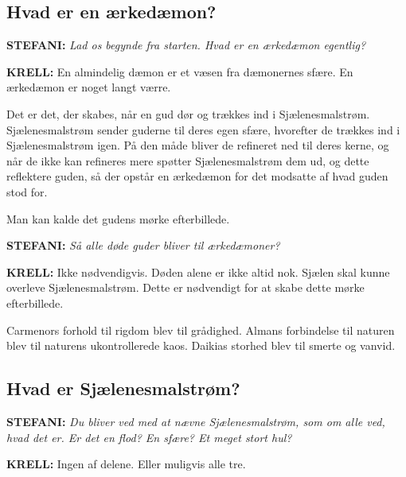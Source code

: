 \documentclass[a4paper,12pt]{memoir}
\begin{document}
\subsection*{Hvad er en ærkedæmon?}

\noindent
{\sffamily\bfseries\color{Maroon!90!black} STEFANI:}
\textit{Lad os begynde fra starten. Hvad er en ærkedæmon
egentlig?}

\par\smallskip

\noindent
{\sffamily\bfseries KRELL:}
En almindelig dæmon er et væsen fra dæmonernes sfære.
En ærkedæmon er noget langt værre.

Det er det, der skabes, når en gud dør og trækkes
ind i Sjælenesmalstrøm. Sjælenesmalstrøm sender guderne til deres egen sfære,
hvorefter de trækkes ind i Sjælenesmalstrøm igen. På den måde bliver de refineret ned til deres kerne, og når de ikke kan refineres mere spøtter Sjælenesmalstrøm dem ud, og dette reflektere guden, så der opstår en ærkedæmon for det modsatte af hvad guden stod for.

Man kan kalde det gudens mørke efterbillede.

\par\medskip

\noindent
{\sffamily\bfseries\color{Maroon!90!black} STEFANI:}
\textit{Så alle døde guder bliver til ærkedæmoner?}

\par\smallskip

\noindent
{\sffamily\bfseries KRELL:}
Ikke nødvendigvis. Døden alene er ikke altid nok. Sjælen skal
kunne overleve Sjælenesmalstrøm. Dette er nødvendigt for at skabe dette mørke efterbillede.

Carmenors forhold til rigdom blev til grådighed. Almans
forbindelse til naturen blev til naturens ukontrollerede kaos.
Daikias storhed blev til smerte og vanvid.

\subsection*{Hvad er Sjælenesmalstrøm?}

\noindent
{\sffamily\bfseries\color{Maroon!90!black} STEFANI:}
\textit{Du bliver ved med at nævne Sjælenesmalstrøm, som om
alle ved, hvad det er. Er det en flod? En sfære? Et meget stort
hul?}

\par\smallskip

\noindent
{\sffamily\bfseries KRELL:}
Ingen af delene. Eller muligvis alle tre.
\end{document}
